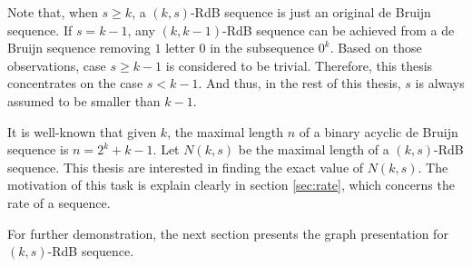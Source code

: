 Note that, when $s\geq k$, a $(k,s)$-RdB sequence is just an original de Bruijn sequence. If $s=k-1$, any $(k,k-1)$-RdB sequence can be achieved from a de Bruijn sequence removing $1$ letter $0$ in the subsequence $0^k$. Based on those observations, case $s\geq k-1$ is considered to be trivial. Therefore, this thesis concentrates on the case $s<k-1$. And thus, in the rest of this thesis, $s$ is always assumed to be smaller than $k-1$.

It is well-known that given $k$, the maximal length $n$ of a binary acyclic de Bruijn sequence is $n=2^{k}+k-1$. Let $N(k,s)$ be the maximal length of a $(k,s)$-RdB sequence. This thesis are interested in finding the exact value of $N(k,s)$. The motivation of this task is explain clearly in section \ref{sec:rate}, which concerns the rate of a sequence. 

For further demonstration, the next section presents the graph presentation for $(k,s)$-RdB sequence.